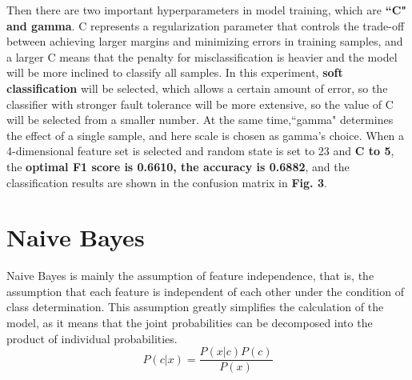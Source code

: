 \documentclass[twocolumn]{IEEEtran}
\begin{document}
Then there are two important hyperparameters in model training, which are \textbf{``C" and gamma}. C represents a regularization parameter that controls the trade-off between achieving larger margins and minimizing errors in training samples, and a larger C means that the penalty for misclassification is heavier and the model will be more inclined to classify all samples. In this experiment, \textbf{soft classification} will be selected, which allows a certain amount of error, so the classifier with stronger fault tolerance will be more extensive, so the value of C will be selected from a smaller number. At the same time,``gamma" determines the effect of a single sample, and here scale is chosen as gamma's choice. When a 4-dimensional feature set is selected and random state is set to 23 and \textbf{C to 5}, the \textbf{optimal F1 score is 0.6610, the accuracy is 0.6882}, and the classification results are shown in the confusion matrix in \textbf{Fig. 3}.

\section{Naive Bayes}
Naive Bayes is mainly the assumption of feature independence, that is, the assumption that each feature is independent of each other under the condition of class determination. This assumption greatly simplifies the calculation of the model, as it means that the joint probabilities can be decomposed into the product of individual probabilities.
\begin{equation}
    P(c|x) = \frac{P(x|c)P(c)}{P(x)}
\end{equation}
\end{document}
